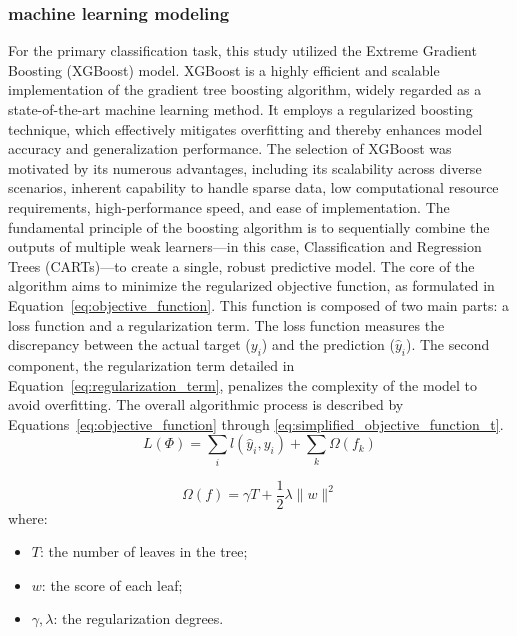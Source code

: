 \subsubsection{machine learning modeling}
For the primary classification task, this study utilized the Extreme Gradient Boosting (XGBoost) model. XGBoost is a highly efficient and scalable implementation of the gradient tree boosting algorithm, widely regarded as a state-of-the-art machine learning method. It employs a regularized boosting technique, which effectively mitigates overfitting and thereby enhances model accuracy and generalization performance. The selection of XGBoost was motivated by its numerous advantages, including its scalability across diverse scenarios, inherent capability to handle sparse data, low computational resource requirements, high-performance speed, and ease of implementation. The fundamental principle of the boosting algorithm is to sequentially combine the outputs of multiple weak learners---in this case, Classification and Regression Trees (CARTs)---to create a single, robust predictive model. The core of the algorithm aims to minimize the regularized objective function, as formulated in Equation~\ref{eq:objective_function}. This function is composed of two main parts: a loss function and a regularization term. The loss function measures the discrepancy between the actual target ($y_i$) and the prediction ($\hat{y}_i$). The second component, the regularization term detailed in Equation~\ref{eq:regularization_term}, penalizes the complexity of the model to avoid overfitting. The overall algorithmic process is described by Equations~\ref{eq:objective_function} through \ref{eq:simplified_objective_function_t}.
\begin{equation} \label{eq:objective_function}
L(\Phi) = \sum_i l(\hat{y}_i, y_i) + \sum_k \Omega(f_k)
\end{equation}

\begin{equation} \label{eq:regularization_term}
\Omega(f) = \gamma T + \frac{1}{2} \lambda \|w\|^2
\end{equation}
where:
\begin{itemize}
    \item $T$: the number of leaves in the tree;
    \item $w$: the score of each leaf;
    \item $\gamma, \lambda$: the regularization degrees.
\end{itemize}

